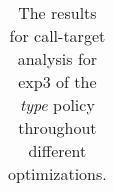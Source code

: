 \begin{table}[h!]
{\begin{tabular}{l|c|c|c}
    	\end{tabular}
%
%
%	
%
%
%
%	
%	
%	
%
%
%
}
		\caption {The results for call-target analysis for exp3 of the \textit{type} policy throughout different optimizations.}
		\label{tbl:CTdestinterexp34TYPE}
\end{table}



